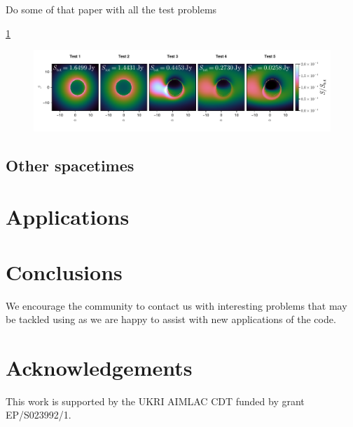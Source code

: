 \documentclass[fleqn,usenatbib]{mnras}
\begin{document}
Do some of that \citep{gold_verification_2020} paper with all the test problems

\ref{fig:gold-test-problems}

\begin{figure}
	\centering
	\includegraphics[width=0.97\linewidth]{figures/radiative-transfer.gold.pdf}
	\caption{}
	\label{fig:gold-test-problems}
\end{figure}

\subsection{Other spacetimes}


\section{Applications}


\section{Conclusions}

We encourage the community to contact us with interesting problems that may be tackled using \Gradus as we are happy to assist with new applications of the code.



\section*{Acknowledgements}
This work is supported by the UKRI AIMLAC CDT funded by grant EP/S023992/1.
\end{document}
